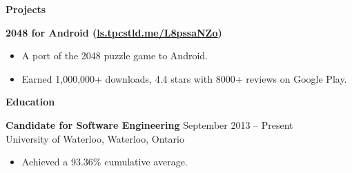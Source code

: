 \documentclass{letter}
\begin{document}
{\bfseries \Large Projects}

\vspace{-1.5mm}
{\bfseries 2048 for Android (\href{http://ls.tpcstld.me/L8pssaNZo}{\uline{ls.tpcstld.me/L8pssaNZo}})}
\vspace{-3mm}
\begin{itemize}
    \item A port of the 2048 puzzle game to Android.
    \item Earned 1,000,000+ downloads, 4.4 stars with 8000+ reviews on Google
      Play.
\end{itemize}

{\bfseries \Large Education}

\vspace{-1.5mm}
{\bfseries Candidate for Software Engineering} \hfill September 2013 -- Present \\
University of Waterloo, Waterloo, Ontario
\vspace{-3mm}
\begin{itemize}
    \item Achieved a 93.36\% cumulative average.
\end{itemize}
\end{document}

